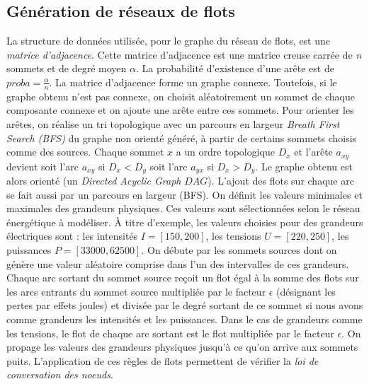 \documentclass[onecolumn, 12pt]{book}
\begin{document}
\subsection{G\'en\'eration de r\'eseaux de flots}
La structure de donn\'ees utilis\'ee, pour le graphe du r\'eseau de flots, est une {\em matrice d'adjacence}.
Cette matrice d'adjacence est une matrice creuse carr\'ee de {\em n} sommets et de degr\'e moyen $\alpha$.
La probabilit\'e d'existence d'une ar\^ete est de $proba = \frac{\alpha}{n}$.\newline
La matrice d'adjacence forme un graphe connexe.
Toutefois, si le graphe obtenu n'est pas connexe, on choisit al\'eatoirement un sommet de chaque composante connexe et on ajoute une ar\^ete entre ces sommets.
\newline
Pour orienter les ar\^etes, on r\'ealise un tri topologique avec un parcours en largeur {\em Breath First Search (BFS)} du graphe non orient\'e g\'en\'er\'e, \`a partir de certains sommets choisis comme des sources. 
Chaque sommet $x$ a un ordre topologique $D_x$ et l'ar\^ete $a_{xy}$ devient soit l'arc $a_{xy}$ si $D_x < D_y$ soit l'arc $a_{yx}$ si $D_x > D_y$. 
Le graphe obtenu est alors orient\'e (un {\em Directed Acyclic Graph} $DAG$).
\newline
L'ajout des flots sur chaque arc se fait aussi par un parcours en largeur (BFS).
On d\'efinit les valeurs minimales et maximales des grandeurs physiques. 
Ces valeurs sont s\'electionn\'ees selon le r\'eseau \'energ\'etique \`a mod\'eliser. 
\`A titre d'exemple, les valeurs choisies pour des grandeurs \'electriques sont : les intensit\'es $I = [150, 200 ]$, les tensions $U = [220, 250]$, les puissances $P = [ 33000, 62500]$. \newline
On d\'ebute par les sommets sources dont on g\'en\`ere une valeur al\'eatoire comprise dans l'un des intervalles de ces grandeurs. 
Chaque arc sortant du sommet source re\c coit  un flot \'egal \`a la somme des flots sur les arcs entrants du sommet source multipli\'ee par le facteur $\epsilon$ (d\'esignant les pertes par effets joules) et divis\'ee par le degr\'e sortant de ce sommet si nous avons comme grandeurs les intensit\'es et les puissances.
Dans le cas de grandeurs comme les tensions, le flot de chaque arc sortant est le flot multipli\'ee par le facteur $\epsilon$. 
On propage les valeurs des grandeurs physiques jusqu'\`a ce qu'on arrive aux sommets puits.
L'application de ces r\`egles de flots permettent de v\'erifier la {\em loi de conversation des noeuds}.
\end{document}
